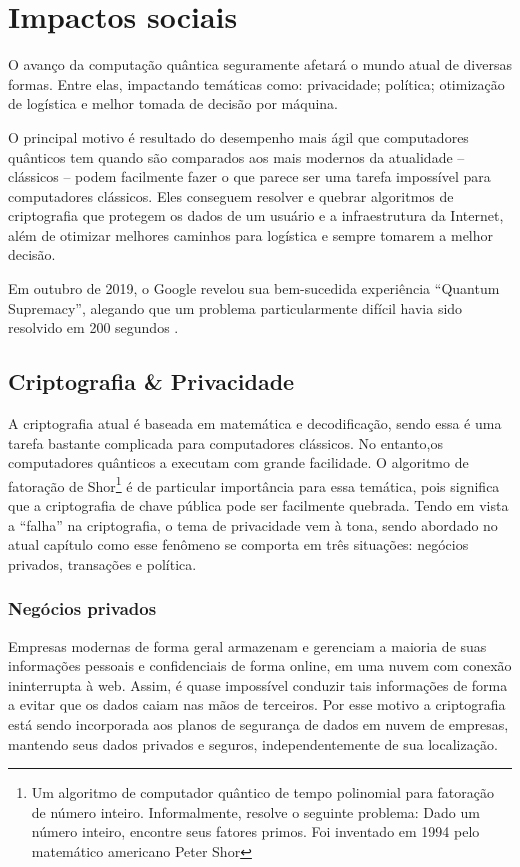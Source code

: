 \section{Impactos sociais}
\label{social_impacts}
O avanço da computação quântica seguramente afetará o mundo atual de diversas formas. Entre elas, impactando temáticas como: privacidade; política; otimização de logística e melhor tomada de decisão por máquina.

O principal motivo é resultado do desempenho mais ágil que computadores quânticos tem quando são comparados aos mais modernos da atualidade – clássicos – podem facilmente fazer o que parece ser uma tarefa impossível para computadores clássicos. Eles conseguem resolver e quebrar algoritmos de criptografia que protegem os dados de um usuário e a infraestrutura da Internet, além de otimizar melhores caminhos para logística e sempre tomarem a melhor decisão.

Em outubro de 2019, o Google revelou sua bem-sucedida experiência “Quantum Supremacy”, alegando que um problema particularmente difícil havia sido resolvido em 200 segundos 
 \cite{15}.

\subsection{Criptografia \& Privacidade}
A criptografia atual é baseada em matemática e decodificação, sendo essa é uma tarefa bastante complicada para computadores clássicos. No entanto,os computadores quânticos a executam com grande facilidade. O algoritmo de fatoração de Shor\footnote{Um algoritmo de computador quântico de tempo polinomial para fatoração de número inteiro. Informalmente, resolve o seguinte problema: Dado um número inteiro, encontre seus fatores primos. Foi inventado em 1994 pelo matemático americano Peter Shor} é de particular importância para essa temática, pois significa que a criptografia de chave pública pode ser facilmente quebrada. Tendo em vista a “falha” na criptografia, o tema de privacidade vem à tona, sendo abordado no atual capítulo como esse fenômeno se comporta em três situações: negócios privados, transações e política.

\subsubsection{Negócios privados}
Empresas modernas de forma geral armazenam e gerenciam a maioria de suas informações pessoais e confidenciais de forma online, em uma nuvem com conexão ininterrupta à web. Assim, é quase impossível conduzir tais informações de forma a evitar que os dados caiam nas mãos de terceiros. Por  esse motivo a criptografia está sendo incorporada aos planos de segurança de dados em nuvem de empresas, mantendo seus dados privados e seguros, independentemente de sua localização. 

